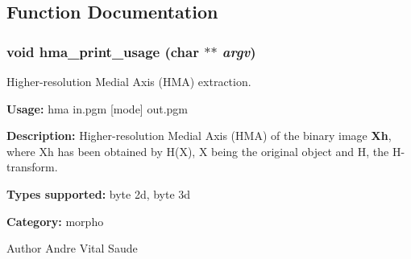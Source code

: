 \subsection{Function Documentation}
\subsubsection[{hma\_\-print\_\-usage}]{\setlength{\rightskip}{0pt plus 5cm}void hma\_\-print\_\-usage (char $\ast$$\ast$ {\em argv})}\label{group__morpho_ga4d4f7b9963cd8a5323a781f4c59912be}


Higher-\/resolution Medial Axis (HMA) extraction. 

{\bfseries Usage:} hma in.pgm [mode] out.pgm

{\bfseries Description:} Higher-\/resolution Medial Axis (HMA) of the binary image {\bfseries Xh}, where Xh has been obtained by H(X), X being the original object and H, the H-\/transform.

{\bfseries Types supported:} byte 2d, byte 3d

{\bfseries Category:} morpho

\begin{DoxyAuthor}{Author}
Andre Vital Saude 
\end{DoxyAuthor}
